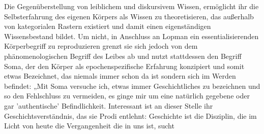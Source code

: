 Die Gegenüberstellung von leiblichem und diskursivem Wissen, ermöglicht ihr die
Selbsterfahrung des eigenen Körpers als Wissen zu theoretisieren, das außerhalb
von kategorialen Rastern existiert und damit einen eigenständigen
Wissensbestand bildet. Um nicht, in Anschluss an Lopman ein essentialisierenden
Körperbegriff zu reproduzieren grenzt sie sich jedoch von dem
phänomenologischen Begriff des Leibes ab und nutzt stattdessen den Begriff
Soma, der den Körper als \glqq epochenspezifische Erfahrung \grqq \footnotemark
{} konzipiert und somit
etwas Bezeichnet, das niemals immer schon da ist sondern sich im Werden
befindet: „Mit Soma versuche ich, etwas immer Geschichtliches zu bezeichnen und
so den Fehlschluss zu vermeiden, es ginge mir um eine natürlich gegebene oder
gar 'authentische' Befindlichkeit. Interessant ist an dieser Stelle ihr
Geschichtsverständnis, das sie Prodi entlehnt: \glqq [...] Geschichte ist die
Disziplin, die im Licht von heute die Vergangenheit die in uns ist, sucht \grqq
\footnotemark {}

